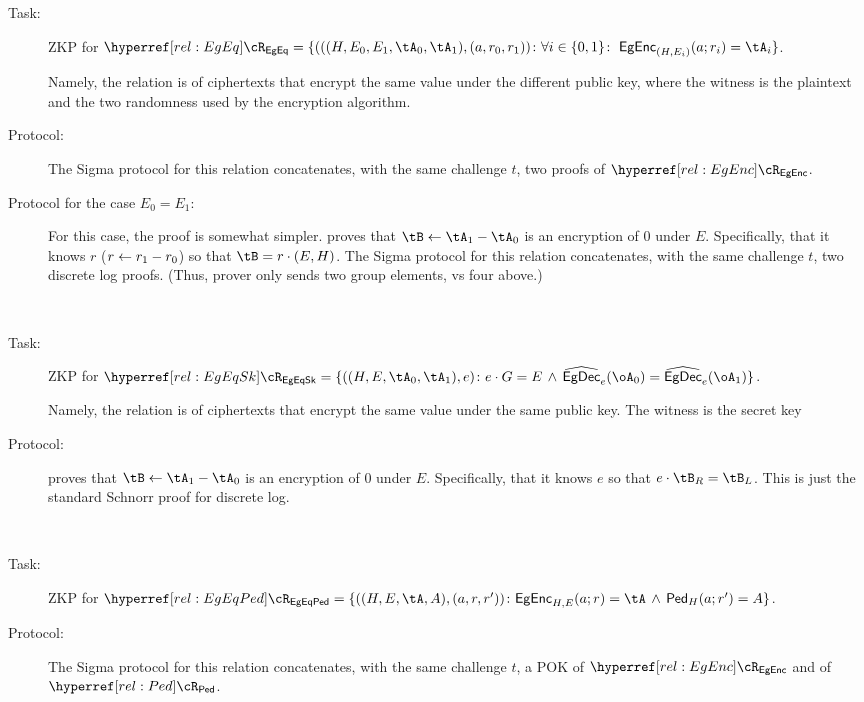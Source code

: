 \begin{description}
	\begin{description}
		\item[Task:] ZKP for  $\rEgEq =\rEgEqDef$.\label{rel:EgEq}
		
		
		Namely, the relation  is of  ciphertexts that encrypt the  same value under the different  public key, where the witness  is the plaintext and the two randomness used by the encryption algorithm.
		
		\item[Protocol:] The Sigma protocol for this relation concatenates, with the same challenge $t$, two proofs of $\rEgEnc$. 

\item[Protocol for the case $E_0=E_1$:] For this case, the proof is somewhat simpler. \Pc proves that $\tB \asn \tA_1 - \tA_0$ is an encryption of $0$ under $E$. Specifically, that it knows $r$ (\ie $r\leftarrow r_1 -r_0$) so that  $\tB  = r\cdot (E,H)$. The Sigma protocol for this relation concatenates, with the same challenge $t$, two discrete log proofs. (Thus, prover only sends two group elements, vs four above.)        		
\end{description}


\item[Equality using secret key.]~




\begin{description}
	\item[Task:] ZKP for  $\rEgEqSk =\rEgEqSkDef$.\label{rel:EgEqSk}
	
	Namely, the relation  is of  ciphertexts that encrypt the  same value under the same public key. The witness is the secret key
	
	\item[Protocol:] \Pc proves that $\tB \asn \tA_1 - \tA_0$ is an encryption of $0$ under $E$. Specifically, that it knows $e$ so that  $e\cdot \tB_R  = \tB_L$. This is just the standard Schnorr proof for discrete log.
	
\end{description}


\item[Equality with Pedersen commitment.]~

\begin{description}
	\item[Task:] ZKP for  $\rEgEqPed =\rEgEqPedDef$.\label{rel:EgEqPed}
	
	\item[Protocol:]  The Sigma protocol for this relation concatenates, with the same challenge $t$, a  POK of $\rEgEnc$ and of $\rPed$. 
\end{description}	



\end{description}
